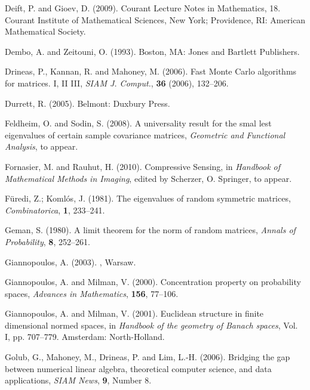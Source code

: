 \documentclass[10pt, openany]{book}
\theoremstyle{remark}
\begin{document}
\begin{thebibliography}{}
 Deift, P. and Gioev, D. (2009).
  Courant Lecture Notes in Mathematics, 18. 
  Courant Institute of Mathematical Sciences, New York; 
  Providence, RI: American Mathematical Society.

 Dembo, A. and Zeitouni, O. (1993).
  Boston, MA: Jones and Bartlett Publishers.

 Drineas, P., Kannan, R. and Mahoney, M. (2006).
  \newblock Fast Monte Carlo algorithms for matrices. I, II III,  
  {\em SIAM J. Comput.}, {\bf 36} (2006), 132--206.

 Durrett, R. (2005).
  Belmont: Duxbury Press.
  
 Feldheim, O. and Sodin, S. (2008).
  \newblock A universality result for the smal lest eigenvalues of certain sample covariance matrices, 
  {\em Geometric and Functional Analysis}, 
  to appear.
  
 Fornasier, M. and Rauhut, H. (2010).
  \newblock Compressive Sensing,
  in {\em Handbook of Mathematical Methods in Imaging}, edited by Scherzer, O.
  Springer, to appear.

 F\"uredi, Z.; Koml\'os, J. (1981).
  The eigenvalues of random symmetric matrices,
  {\em Combinatorica}, {\bf 1}, 233--241. 
  
 Geman, S. (1980).
  \newblock A limit theorem for the norm of random matrices,
  {\em Annals of Probability}, {\bf 8}, 252--261.

 Giannopoulos, A. (2003).
  ,
  Warsaw.

 Giannopoulos, A. and Milman, V. (2000).
  \newblock Concentration property on probability spaces,
  {\em Advances in Mathematics}, {\bf 156}, 77--106. 

 Giannopoulos, A. and Milman, V. (2001). 
  \newblock Euclidean structure in finite dimensional normed spaces,
  in {\em Handbook of the geometry of Banach spaces}, Vol. I, pp. 707--779.
  Amsterdam: North-Holland.
  
 Golub, G., Mahoney, M., Drineas, P. and Lim, L.-H. (2006).
  \newblock Bridging the gap between numerical linear algebra, 
    theoretical computer science, and data applications,
  {\em SIAM News}, {\bf 9}, Number 8.
    

\end{thebibliography}
\end{document}
